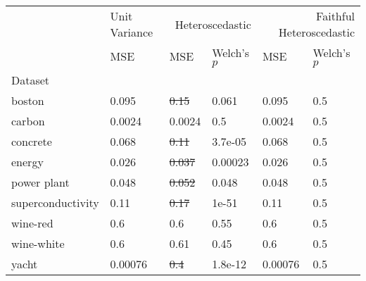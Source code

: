 \begin{tabular}{l|l|ll|ll}
\toprule
 & Unit Variance & \multicolumn{2}{r}{Heteroscedastic} & \multicolumn{2}{r}{Faithful Heteroscedastic} \\
 & MSE & MSE & Welch's $p$ & MSE & Welch's $p$ \\
Dataset &  &  &  &  &  \\
\midrule
boston & 0.095 & \sout{0.15} & 0.061 & 0.095 & 0.5 \\
carbon & 0.0024 & 0.0024 & 0.5 & 0.0024 & 0.5 \\
concrete & 0.068 & \sout{0.11} & 3.7e-05 & 0.068 & 0.5 \\
energy & 0.026 & \sout{0.037} & 0.00023 & 0.026 & 0.5 \\
power plant & 0.048 & \sout{0.052} & 0.048 & 0.048 & 0.5 \\
superconductivity & 0.11 & \sout{0.17} & 1e-51 & 0.11 & 0.5 \\
wine-red & 0.6 & 0.6 & 0.55 & 0.6 & 0.5 \\
wine-white & 0.6 & 0.61 & 0.45 & 0.6 & 0.5 \\
yacht & 0.00076 & \sout{0.4} & 1.8e-12 & 0.00076 & 0.5 \\
\bottomrule
\end{tabular}
